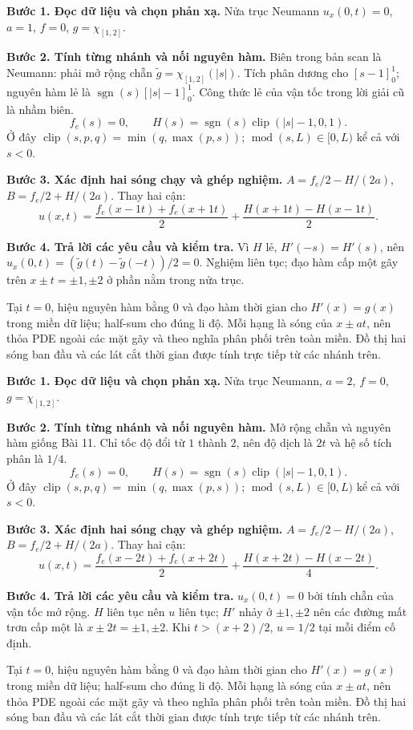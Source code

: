 \textbf{Bước 1. Đọc dữ liệu và chọn phản xạ.} Nửa trục Neumann $u_x(0,t)=0$, $a=1$, $f=0$, $g=\chi_{[1,2]}$.

\textbf{Bước 2. Tính từng nhánh và nối nguyên hàm.} Biên trong bản scan là Neumann: phải mở rộng chẵn $\widetilde g=\chi_{[1,2]}(|s|)$. Tích phân dương cho $[s-1]_0^1$; nguyên hàm lẻ là $\operatorname{sgn}(s)[|s|-1]_0^1$. Công thức lẻ của vận tốc trong lời giải cũ là nhầm biên.
\[f_e(s)=0,\qquad H(s)=\operatorname{sgn}(s)\operatorname{clip}(|s|-1,0,1).\]
Ở đây $\operatorname{clip}(s,p,q)=\min(q,\max(p,s))$; $\operatorname{mod}(s,L)\in[0,L)$ kể cả với $s<0$.

\textbf{Bước 3. Xác định hai sóng chạy và ghép nghiệm.} $A=f_e/2-H/(2a)$, $B=f_e/2+H/(2a)$. Thay hai cận:
\[u(x,t)=\frac{f_e(x-1t)+f_e(x+1t)}2+\frac{H(x+1t)-H(x-1t)}{2}.\]

\textbf{Bước 4. Trả lời các yêu cầu và kiểm tra.} Vì $H$ lẻ, $H'(-s)=H'(s)$, nên $u_x(0,t)=(\widetilde g(t)-\widetilde g(-t))/2=0$. Nghiệm liên tục; đạo hàm cấp một gãy trên $x\pm t=\pm1,\pm2$ ở phần nằm trong nửa trục.

Tại $t=0$, hiệu nguyên hàm bằng $0$ và đạo hàm thời gian cho $H'(x)=g(x)$ trong miền dữ liệu; half-sum cho đúng li độ. Mỗi hạng là sóng của $x\pm at$, nên thỏa PDE ngoài các mặt gãy và theo nghĩa phân phối trên toàn miền. Đồ thị hai sóng ban đầu và các lát cắt thời gian được tính trực tiếp từ các nhánh trên.

\textbf{Bước 1. Đọc dữ liệu và chọn phản xạ.} Nửa trục Neumann, $a=2$, $f=0$, $g=\chi_{[1,2]}$.

\textbf{Bước 2. Tính từng nhánh và nối nguyên hàm.} Mở rộng chẵn và nguyên hàm giống Bài 11. Chỉ tốc độ đổi từ $1$ thành $2$, nên độ dịch là $2t$ và hệ số tích phân là $1/4$.
\[f_e(s)=0,\qquad H(s)=\operatorname{sgn}(s)\operatorname{clip}(|s|-1,0,1).\]
Ở đây $\operatorname{clip}(s,p,q)=\min(q,\max(p,s))$; $\operatorname{mod}(s,L)\in[0,L)$ kể cả với $s<0$.

\textbf{Bước 3. Xác định hai sóng chạy và ghép nghiệm.} $A=f_e/2-H/(2a)$, $B=f_e/2+H/(2a)$. Thay hai cận:
\[u(x,t)=\frac{f_e(x-2t)+f_e(x+2t)}2+\frac{H(x+2t)-H(x-2t)}{4}.\]

\textbf{Bước 4. Trả lời các yêu cầu và kiểm tra.} $u_x(0,t)=0$ bởi tính chẵn của vận tốc mở rộng. $H$ liên tục nên $u$ liên tục; $H'$ nhảy ở $\pm1,\pm2$ nên các đường mất trơn cấp một là $x\pm2t=\pm1,\pm2$. Khi $t>(x+2)/2$, $u=1/2$ tại mỗi điểm cố định.

Tại $t=0$, hiệu nguyên hàm bằng $0$ và đạo hàm thời gian cho $H'(x)=g(x)$ trong miền dữ liệu; half-sum cho đúng li độ. Mỗi hạng là sóng của $x\pm at$, nên thỏa PDE ngoài các mặt gãy và theo nghĩa phân phối trên toàn miền. Đồ thị hai sóng ban đầu và các lát cắt thời gian được tính trực tiếp từ các nhánh trên.

